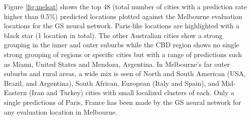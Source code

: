 \documentclass[sageh,times]{sagej}
\begin{document}



Figure \ref{fig:melsat} shows the top 48 (total number of cities with a prediction rate higher than 0.5\%) predicted locations plotted against the Melbourne evaluation locations for the GS neural network. Paris-like locations are highlighted with a black star (1 location in total).  The other Australian cities show a strong grouping in the inner and outer suburbs while the CBD region shows no single strong grouping of regions or specific cities but with a range of predictions such as Miami, United States and Mendoza, Argentina. In Melbourne's far outer suburbs and rural areas, a wide mix is seen of North and South American (USA, Brazil, and Argentina), South African, European (Italy and Spain), and Mid-Eastern (Iran and Turkey) cities with small localized clusters of each. Only a single predictions of Paris, France has been made by the GS neural network for any evaluation location in Melbourne.


\end{document}
